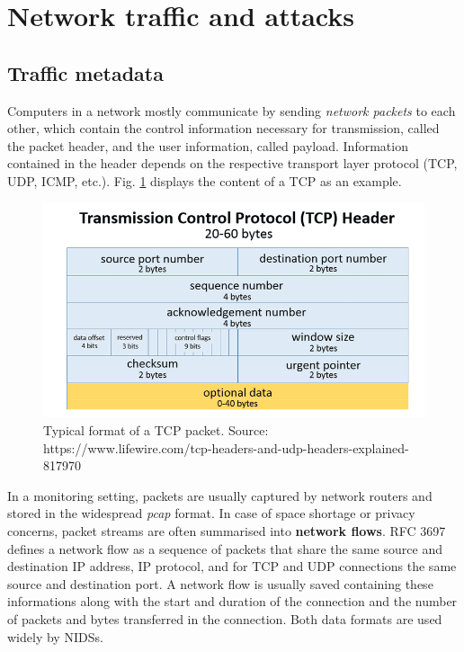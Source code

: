 
\section{Network traffic and attacks}\label{traffic}

\subsection{Traffic metadata}

Computers in a network mostly communicate by sending \textit{network packets} to each other, which contain the control information necessary for transmission, called the packet header, and the user information, called payload. Information contained in the header depends on the respective transport layer protocol (TCP, UDP, ICMP, etc.). Fig. \ref{Fig:TCPheader} displays the content of a TCP as an example.

\begin{figure}[h!]
\centering
\includegraphics[scale=0.4]{images/tcp_header.png}
\caption{Typical format of a TCP packet. Source:\scriptsize{ https://www.lifewire.com/tcp-headers-and-udp-headers-explained-817970}\normalsize}\label{Fig:TCPheader}
\end{figure}

In a monitoring setting, packets are usually captured by network routers and stored in the widespread \textit{pcap} format. In case of space shortage or privacy concerns, packet streams are often summarised into \textbf{network flows}. RFC 3697 \cite{brownlee1999traffic} defines a network flow as a sequence of packets that share the same source and destination IP address, IP protocol, and for TCP and UDP connections the same source and destination port. A network flow is usually saved containing these informations along with the start and duration of the connection and the number of packets and bytes transferred in the connection. Both data formats are used widely by NIDSs.

